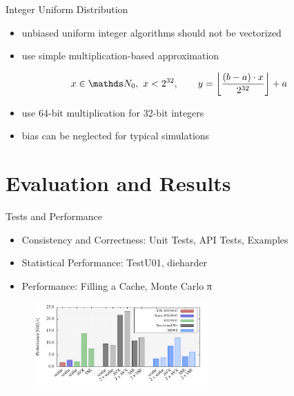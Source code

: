 \documentclass[aspectratio=169]{beamer}
\begin{document}
    \begin{frame}{Integer Uniform Distribution}
      \begin{itemize}
        \pause
        \item unbiased uniform integer algorithms should not be vectorized
        \pause
        \item use simple multiplication-based approximation
      \end{itemize}
      \bigskip
      \begin{mybox}
        \[
          x\in\setNatural_0,\ x < 2^{32},\qquad y = \floorBrackets{\frac{(b-a)\cdot x}{2^{32}}} + a
        \]
      \end{mybox}
      \bigskip
      \begin{itemize}
        \pause
        \item use 64-bit multiplication for 32-bit integers
        \pause
        \item bias can be neglected for typical simulations
      \end{itemize}
    \end{frame}

  \section{Evaluation and Results} %
  \label{sec:evaluation_and_results}
    \begin{frame}{Tests and Performance}
      \begin{itemize}
        \pause
        \item Consistency and Correctness: Unit Tests, API Tests, Examples
        \pause
        \item Statistical Performance: TestU01, dieharder
        \pause
        \item Performance: Filling a Cache, Monte Carlo π
      \end{itemize}
      \begin{figure}
        \includegraphics[width=0.6\textwidth]{figures/generation_desktop.pdf}
      \end{figure}
    \end{frame}
\end{document}
